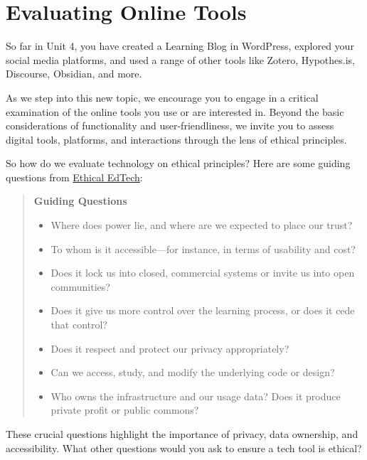 \documentclass[
]{book}
\providecommand{\tightlist}{%
  \setlength{\itemsep}{0pt}\setlength{\parskip}{0pt}}
\theoremstyle{definition}
\theoremstyle{definition}
\theoremstyle{definition}
\theoremstyle{definition}
\theoremstyle{remark}
\begin{document}
\hypertarget{evaluating-online-tools}{%
\section{Evaluating Online Tools}\label{evaluating-online-tools}}

So far in Unit 4, you have created a Learning Blog in WordPress, explored your social media platforms, and used a range of other tools like Zotero, Hypothes.is, Discourse, Obsidian, and more.

As we step into this new topic, we encourage you to engage in a critical examination of the online tools you use or are interested in. Beyond the basic considerations of functionality and user-friendliness, we invite you to assess digital tools, platforms, and interactions through the lens of ethical principles.

So how do we evaluate technology on ethical principles? Here are some guiding questions from \href{https://ethicaledtech.info/wiki/Meta:About}{Ethical EdTech}:

\begin{quote}
\textbf{Guiding Questions}

\begin{itemize}
\tightlist
\item
  Where does power lie, and where are we expected to place our trust?\\
\item
  To whom is it accessible---for instance, in terms of usability and cost?\\
\item
  Does it lock us into closed, commercial systems or invite us into open communities?\\
\item
  Does it give us more control over the learning process, or does it cede that control?\\
\item
  Does it respect and protect our privacy appropriately?\\
\item
  Can we access, study, and modify the underlying code or design?\\
\item
  Who owns the infrastructure and our usage data? Does it produce private profit or public commons?
\end{itemize}
\end{quote}

These crucial questions highlight the importance of privacy, data ownership, and accessibility. What other questions would you ask to ensure a tech tool is ethical?
\end{document}
